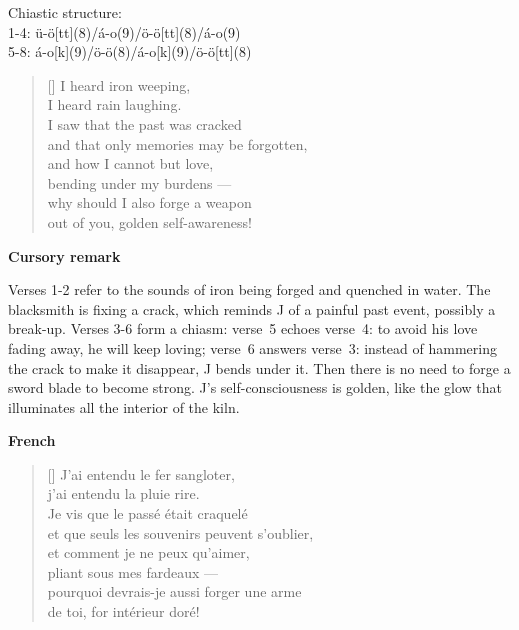 \documentclass[a4paper,12pt,twoside,final]{book}
\begin{document}

\noindent Chiastic structure: \\
1-4: ü-ö[tt](8)/á-o(9)/ö-ö[tt](8)/á-o(9) \\
5-8: á-o[k](9)/ö-ö(8)/á-o[k](9)/ö-ö[tt](8)

\newpage



\settowidth{\versewidth}{and that only a memory may be forgotten;}

\begin{verse}[\versewidth]
  I heard iron weeping, \\
  I heard rain laughing. \\
  I saw that the past was cracked \\
  and that only memories may be forgotten, \\
  and how I cannot but love, \\
  bending under my burdens --- \\
  why should I also forge a weapon \\
  out of you, golden self-awareness! \\
\end{verse}

\bigskip

\noindent \textbf{Cursory remark}

\medskip

Verses 1-2 refer to the sounds of iron being forged and quenched in
water. The blacksmith is fixing a crack, which reminds J of a painful
past event, possibly a break\hyp{}up. Verses 3-6 form a chiasm:
verse~5 echoes verse~4: to avoid his love fading away, he will keep
loving; verse~6 answers verse~3: instead of hammering the crack to
make it disappear, J bends under it. Then there is no need to forge a
sword blade to become strong. J's self\hyp{}consciousness is golden,
like the glow that illuminates all the interior of the kiln.

\bigskip

\noindent \textbf{French}


\settowidth{\versewidth}{et que seuls les souvenirs peuvent s'oublier,}

\begin{verse}[\versewidth]
  J'ai entendu le fer sangloter, \\
  j'ai entendu la pluie rire. \\
  Je vis que le passé était craquelé \\
  et que seuls les souvenirs peuvent s'oublier, \\
  et comment je ne peux qu'aimer, \\
  pliant sous mes fardeaux --- \\
  pourquoi devrais-je aussi forger une arme \\
  de toi, for intérieur doré! \\
\end{verse}
\end{document}
